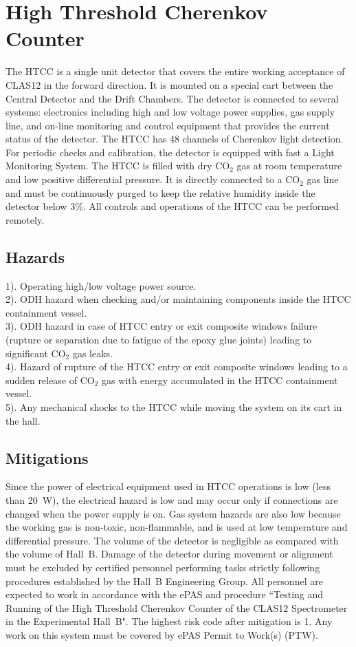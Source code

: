 \section{High Threshold Cherenkov Counter}

The HTCC is a single unit detector that covers the entire working acceptance of CLAS12 
in the forward direction. It is mounted on a special cart between the Central Detector 
and the Drift Chambers. The detector is connected to several systems: electronics including 
high and low voltage power supplies, gas supply line, and on-line monitoring and control 
equipment that provides the current status of the detector. The HTCC has 48 channels of Cherenkov 
light detection. For periodic checks and calibration, the detector is equipped with fast a 
Light Monitoring System. The HTCC is filled with dry CO$_2$ gas at room temperature and 
low positive differential pressure. It is directly connected to a CO$_2$ gas line and must 
be continuously purged to keep the relative humidity inside the detector below 3\%. All 
controls and operations of the HTCC can be performed remotely.
 
\subsection{Hazards} 

1). Operating high/low voltage power source. \\
2). ODH hazard when checking and/or maintaining components inside the HTCC containment vessel.\\
3). ODH hazard in case of HTCC entry or exit composite windows failure (rupture or 
separation due to fatigue of the epoxy glue joints) leading to significant CO$_2$ gas leaks.\\
4). Hazard of rupture of the HTCC entry or exit composite windows leading to a sudden release of 
CO$_2$ gas with energy accumulated in the HTCC containment vessel.\\
5). Any mechanical shocks to the HTCC while moving the system on its cart in the hall.

\subsection{Mitigations}

Since the power of electrical equipment used in HTCC operations is low (less than 20~W), the 
electrical hazard is low and may occur only if connections are changed when the power supply is on.
Gas system hazards are also low because the working gas is non-toxic, non-flammable, and is 
used at low temperature and differential pressure. The volume of the detector is negligible as 
compared with the volume of Hall~B. Damage of the detector during movement or alignment must be 
excluded by certified personnel performing tasks strictly following procedures established by 
the Hall~B Engineering Group. All personnel are expected to work in accordance with the ePAS and
procedure ``Testing and Running of the High Threshold Cherenkov Counter of the CLAS12 Spectrometer
in the Experimental Hall~B". The highest risk code after mitigation is 1.
Any work on this system must be covered by ePAS Permit to Work(s) (PTW).

